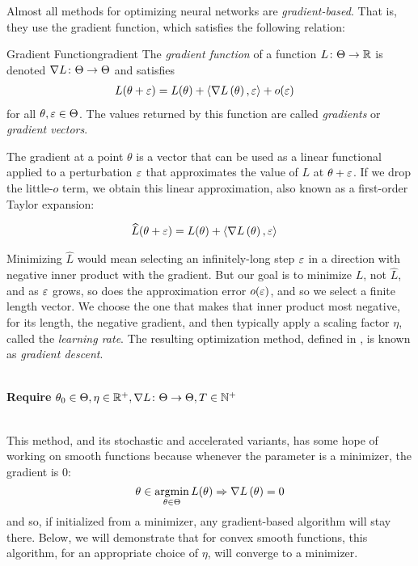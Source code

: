 \documentclass[../../thesis.tex]{subfiles}
\begin{document}
Almost all methods for optimizing neural networks
are \emph{gradient-based}.
That is, they use the gradient function,
which satisfies the following relation:

\begin{definition}{Gradient Function}{gradient}
	The \emph{gradient function} of a function $L \colon \Theta \to \mathbb{R}$
	is denoted $\nabla{L} \colon \Theta \to \Theta$
	and satisfies
	\begin{align}
		&L(\theta + \eps) = L(\theta) + \langle\grad{L}{\theta},\eps\rangle + o(\eps)\equationlabel{grad-def}
	\end{align}
	for all $\theta, \varepsilon \in \Theta$.
	The values returned by this function are called \emph{gradients}
	or \emph{gradient vectors}.
\end{definition}

The gradient at a point $\theta$ is a vector that can be used
as a linear functional applied to a perturbation $\varepsilon$ that approximates
the value of $L$ at $\theta + \varepsilon$.
If we drop the little-$o$ term,
we obtain this linear approximation,
also known as a first-order Taylor expansion:

\begin{align}
	&\widehat{L}(\theta + \varepsilon) = L(\theta) + \langle\nabla L\left(\theta\right),\varepsilon\rangle
\end{align}

Minimizing $\hat{L}$ would mean selecting an infinitely-long step $\varepsilon$
in a direction with negative inner product with the gradient.
But our goal is to minimize $L$, not $\hat{L}$,
and as $\varepsilon$ grows, so does the approximation error $o(\varepsilon)$,
and so we select a finite length vector.
We choose the one that makes that inner product most negative,
for its length,
the negative gradient,
and then typically apply a scaling factor $\eta$,
called the \emph{learning rate}.
The resulting optimization method,
defined in ,
is known as \emph{gradient descent}.
\\\\
\begin{algorithm}[H]
	\SetAlgoLined{}
	\textbf{Require} $\theta_0\in\Theta, \eta\in\mathbb{R}^+, \nabla{L}\colon\Theta\to\Theta, T\in\mathbb{N}^+$\\
	\caption{Gradient Descent}
\end{algorithm}
\ \\
This method,
and its stochastic and accelerated variants,
has some hope of working on smooth functions because
whenever the parameter is a minimizer,
the gradient
is $0$:
\begin{equation}\equationlabel{minimizers-critical}
	\theta \in \argmin_{\theta \in \Theta} L(\theta) \Rightarrow \grad{L}{\theta} = 0
\end{equation}
and so, if initialized from a minimizer,
any gradient-based algorithm will stay there.
Below, we will demonstrate that for
convex smooth functions,
this algorithm, for an appropriate choice of $\eta$,
will converge to a minimizer.
\end{document}
